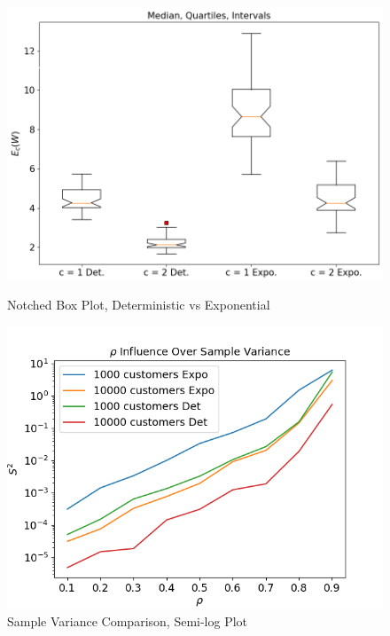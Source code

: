 \documentclass{article}
\begin{document}
    \begin{figure}[h]
        \centering
        \begin{minipage}[b]{0.45\textwidth}
            \includegraphics[width=\textwidth]{pictures/part_4/notched_box_det.png}
            \caption{Notched Box Plot, Deterministic vs  Exponential}
            \label{fig:notchedbox}
        \end{minipage}
        \hfill
        \begin{minipage}[b]{0.45\textwidth}
            \includegraphics[width=\textwidth]{pictures/part_4/samp_var_det.png}
            \caption{Sample Variance Comparison, Semi-log Plot}
            \label{fig:samp_var_det}
        \end{minipage}
    \end{figure}
\end{document}
